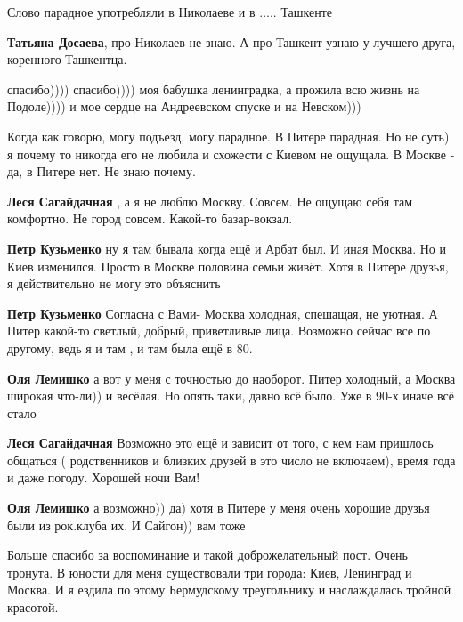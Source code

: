 \begin{itemize}
\begin{itemize}
Слово парадное употребляли в Николаеве и в ..... Ташкенте

\textbf{Татьяна Досаева}, про Николаев не знаю. А про Ташкент узнаю у лучшего друга, коренного Ташкентца.
\end{itemize} %

спасибо)))) спасибо)))) моя бабушка ленинградка, а прожила всю жизнь на Подоле)))) и мое сердце на Андреевском спуске и на Невском)))


Когда как говорю, могу подъезд, могу парадное. В Питере парадная. Но не суть) я
почему то никогда его не любила и схожести с Киевом не ощущала. В Москве - да,
в Питере нет. Не знаю почему.

\begin{itemize} %
\textbf{Леся Сагайдачная} , а я не люблю Москву. Совсем. Не ощущаю себя там комфортно. Не город совсем. Какой-то базар-вокзал.

\textbf{Петр Кузьменко} ну я там бывала когда ещё и Арбат был. И иная Москва. Но и Киев изменился. Просто в Москве половина семьи живёт. Хотя в Питере друзья, я действительно не могу это объяснить

\textbf{Петр Кузьменко} Согласна с Вами- Москва холодная, спешащая, не уютная. А Питер какой-то светлый, добрый, приветливые лица. Возможно сейчас все по другому, ведь я и там , и там была ещё в 80.

\textbf{Оля Лемишко} а вот у меня с точностью до наоборот. Питер холодный, а Москва широкая что-ли)) и весёлая. Но опять таки, давно всё было. Уже в 90-х иначе всё стало

\textbf{Леся Сагайдачная} Возможно это ещё и зависит от того, с кем нам пришлось общаться ( родственников и близких друзей в это число не включаем), время года и даже погоду. Хорошей ночи Вам!

\textbf{Оля Лемишко} а возможно)) да) хотя в Питере у меня очень хорошие друзья были из рок.клуба их. И Сайгон)) вам тоже
\end{itemize} %


Больше спасибо за воспоминание и такой доброжелательный пост. Очень тронута. В
юности для меня существовали три города: Киев, Ленинград и Москва. И я ездила
по этому Бермудскому треугольнику и наслаждалась тройной красотой.


\end{itemize}

